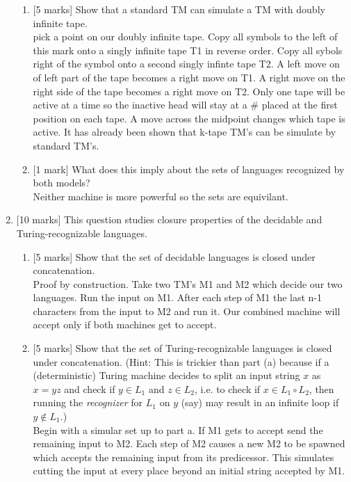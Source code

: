 \documentclass{article}
\begin{document}
\begin{enumerate}
\begin{enumerate}
            \item {[5 marks]} Show that a standard TM can simulate a TM with doubly infinite tape. \\
pick a point on our doubly infinite tape. Copy all symbols to the left of this mark onto a singly infinite tape T1 in reverse order. Copy all sybols right of the symbol onto a second singly infinte tape T2. A left move on of left part of the tape becomes a right move on T1. A right move on the right side of the tape becomes a right move on T2. Only one tape will be active at a time so the inactive head will stay at a \# placed at the first position on each tape. A move across the midpoint changes which tape is active. It has already been shown that k-tape TM's can be simulate by standard TM's.
            \item {[1 mark]} What does this imply about the sets of languages recognized by both models? \\ Neither machine is more powerful so the sets are equivilant. 
        \end{enumerate}
    \item {[10 marks]} This question studies closure properties of the decidable and Turing-recognizable languages.
        \begin{enumerate}
            \item {[5 marks]} Show that the set of decidable languages is closed under concatenation. \\ Proof by construction. Take two TM's M1 and M2 which decide our two languages. Run the input on M1. After each step of M1 the last n-1 characters from the input to M2 and run it. Our combined machine will accept only if both machines get to accept.
            \item {[5 marks]} Show that the set of Turing-recognizable languages is closed under concatenation. (Hint: This is trickier than part (a) because if a (deterministic) Turing machine decides to split an input string $x$ as $x=yz$ and check if $y\in L_1$ and $z\in L_2$, i.e. to check if $x\in L_1\circ L_2$, then running the \emph{recognizer} for $L_1$ on $y$ (say) may result in an infinite loop if $y\not\in L_1$.)\\
        Begin with a simular set up to part a. If M1 gets to accept send the remaining input to M2. Each step of M2 causes a new M2 to be spawned which accepts the remaining input from its predicessor. This simulates cutting the input at every place beyond an initial string accepted by M1.     
        \end{enumerate}


\end{enumerate}
\end{document}
